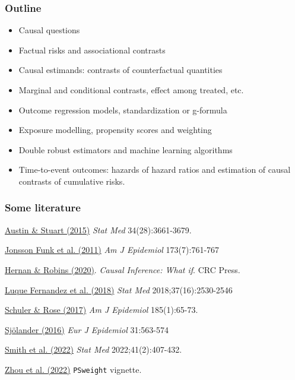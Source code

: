 \documentclass[12pt,dvipsnames,t,aspectratio=169, handout%
]{beamer}
\begin{document}
\begin{frame}
\frametitle{Outline}

\begin{itemize}

\item Causal questions
\medskip
\item Factual risks and associational contrasts 
\medskip
\item Causal estimands: contrasts of counterfactual quantities
\medskip
\item Marginal and conditional contrasts, effect among treated, etc.
\medskip
\item Outcome regression models, standardization or g-formula
\medskip
\item Exposure modelling, propensity scores and weighting 
\medskip
\item Double robust estimators and machine learning algorithms
\medskip
\item Time-to-event outcomes: hazards of hazard ratios and estimation
of causal contrasts of cumulative risks. 

\end{itemize}

\end{frame}

\begin{frame}
\frametitle{\large Some literature}
\bi
\item \href{https://doi.org/10.1002/sim.6607}{\color{blue}Austin \& Stuart (2015)} {\it Stat Med} 34(28):3661-3679.
\medskip 
\item
\href{https://doi.org/10.1093/aje/kwq439}{\color{blue} Jonsson Funk et al. (2011)} {\it Am J Epidemiol}  173(7):761-767
\medskip
\item
\href{https://www.hsph.harvard.edu/miguel-hernan/causal-inference-book/}
{\color{blue}Hernan \& Robins (2020)}. \textit{Causal Inference: What if}.
CRC Press.
\medskip
\item
\href{https://doi.org/10.1002/sim.7628}{\color{blue}Luque Fernandez et al. (2018)}
{\it Stat Med} 2018;37(16):2530-2546
\medskip
\item
\href{https://doi.org/10.1093/aje/kww165}{\color{blue}Schuler \& Rose (2017)} \textit{Am J Epidemiol} 185(1):65-73.
\medskip
\item 
 \href{https://doi.org/10.1007/s10654-016-0157-3}{\color{blue}Sj{\"o}lander (2016)} {\it Eur J Epidemiol} 31:563-574
\medskip
\item
\href{https://doi.org/10.1002/sim.9234}{\color{blue}Smith et al. (2022)} {\it Stat Med} 2022;41(2):407-432.
\medskip
\item
\href{https://cran.r-project.org/web/packages/PSweight/vignettes/vignette.pdf}{\color{blue}Zhou et al. (2022)} \texttt{PSweight} vignette.

\ei

\end{frame}
\end{document}

